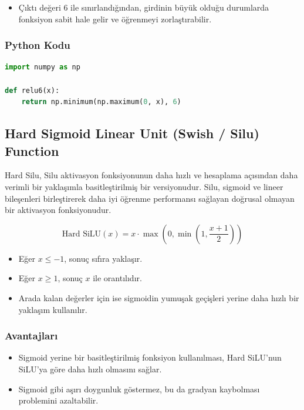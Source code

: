 \begin{itemize}
    \item Çıktı değeri 6 ile sınırlandığından, girdinin büyük olduğu durumlarda fonksiyon sabit hale gelir ve öğrenmeyi zorlaştırabilir.
\end{itemize}

\subsubsection{Python Kodu}

\begin{lstlisting}[language=Python]
import numpy as np

def relu6(x):
    return np.minimum(np.maximum(0, x), 6)
\end{lstlisting}

\newpage

\subsection{Hard Sigmoid Linear Unit (Swish / Silu) Function}

Hard Silu, Silu aktivasyon fonksiyonunun daha hızlı ve hesaplama açısından daha verimli bir yaklaşımla basitleştirilmiş bir versiyonudur. Silu, sigmoid ve lineer bileşenleri birleştirerek daha iyi öğrenme performansı sağlayan doğrusal olmayan bir aktivasyon fonksiyonudur.

\[ \text{Hard SiLU}(x) = x \cdot \max(0, \min(1, \frac{x + 1}{2})) \]

\begin{itemize}
    \item Eğer $x \leq -1$, sonuç sıfıra yaklaşır.
    \item Eğer $x \geq 1$, sonuç $x$ ile orantılıdır.
    \item Arada kalan değerler için ise sigmoidin yumuşak geçişleri yerine daha hızlı bir yaklaşım kullanılır.
\end{itemize}

\subsubsection{Avantajları}

\begin{itemize}
    \item Sigmoid yerine bir basitleştirilmiş fonksiyon kullanılması, Hard SiLU'nun SiLU'ya göre daha hızlı olmasını sağlar.
    \item Sigmoid gibi aşırı doygunluk göstermez, bu da gradyan kaybolması problemini azaltabilir.
\end{itemize}

